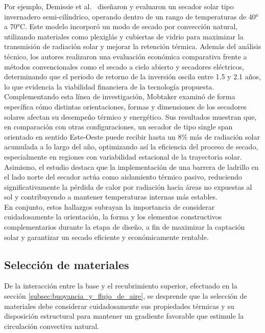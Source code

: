 \documentclass[12pt]{article}
\begin{document}
Por ejemplo, Demissie et al.~\cite{Demissie2024} diseñaron y evaluaron un secador solar tipo invernadero semi-cilíndrico, operando dentro de un rango de temperaturas de 40° a 70°C. Este modelo incorporó un modo de secado por convección natural, utilizando materiales como plexiglás y cubiertas de vidrio para maximizar la transmisión de radiación solar y mejorar la retención térmica. Además del análisis técnico, los autores realizaron una evaluación económica comparativa frente a métodos convencionales como el secado a cielo abierto y secadores eléctricos, determinando que el periodo de retorno de la inversión oscila entre 1.5 y 2.1 años, lo que evidencia la viabilidad financiera de la tecnología propuesta.\\

Complementando esta línea de investigación, Mobtaker examinó de forma específica cómo distintas orientaciones, formas y dimensiones de los secadores solares afectan su desempeño térmico y energético. Sus resultados muestran que, en comparación con otras configuraciones, un secador de tipo single span orientado en sentido Este-Oeste puede recibir hasta un 8\% más de radiación solar acumulada a lo largo del año, optimizando así la eficiencia del proceso de secado, especialmente en regiones con variabilidad estacional de la trayectoria solar. Asimismo, el estudio destaca que la implementación de una barrera de ladrillo en el lado norte del secador actúa como aislamiento térmico pasivo, reduciendo significativamente la pérdida de calor por radiación hacia áreas no expuestas al sol y contribuyendo a mantener temperaturas internas más estables.\\

En conjunto, estos hallazgos subrayan la importancia de considerar cuidadosamente la orientación, la forma y los elementos constructivos complementarios durante la etapa de diseño, a fin de maximizar la captación solar y garantizar un secado eficiente y económicamente rentable.



\subsection{Selección de materiales}
De la interacción entre la base y el recubrimiento superior, efectuado en la sección \ref{subsec:buoyancia_y_flujo_de_aire}, se desprende que la selección de materiales debe considerar cuidadosamente sus propiedades térmicas y su disposición estructural para mantener un gradiente favorable que estimule la circulación convectiva natural.\\
\end{document}

